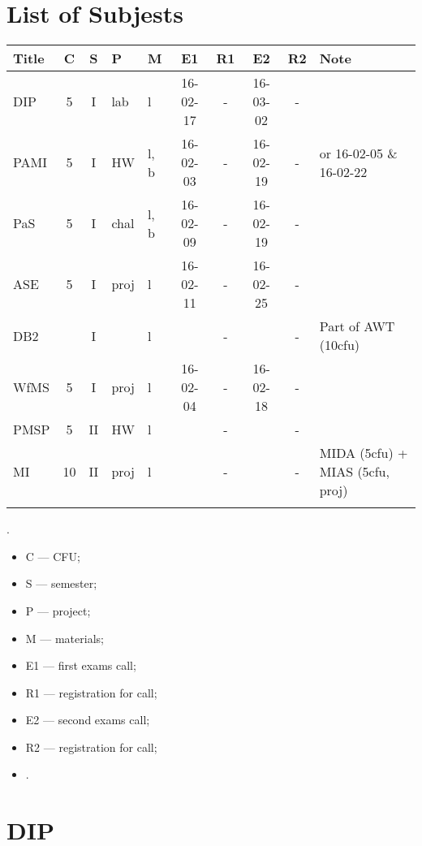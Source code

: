 \documentclass[a4paper,12pt]{article} %
\begin{document}
\tableofcontents

\newpage
\section{List of Subjests}
\begin{tabularx}{\textwidth}{|l|c|c|l|l|c|c|c|c|X|}
	\hline
	Title & C & S & P & M & E1 & R1 & E2 & R2 & Note \\
	\hline
	DIP & 5 & I & lab & l & 16-02-17 & - & 16-03-02 & - &  \\
	\hline
	PAMI & 5 & I & HW & l, b & 16-02-03 & - & 16-02-19 & - & or 16-02-05 \& 16-02-22\\
	\hline
	PaS & 5 & I & chal & l, b & 16-02-09 & - & 16-02-19 & - &  \\
	\hline
	ASE & 5 & I & proj & l & 16-02-11 & - & 16-02-25 & - &  \\
	\hline
	DB2 &  & I &  & l & & - & & - & Part of AWT (10cfu) \\
	\hline
	WfMS & 5 & I & proj & l & 16-02-04 & - & 16-02-18 & - &  \\
	\hline
	PMSP & 5 & II & HW & l & & - & & - &  \\
	\hline
	MI & 10 & II & proj & l & & - & & - & MIDA (5cfu) + MIAS (5cfu, proj) \\
	\hline
	&  &  &  &  &  & & & &  \\
	\hline
\end{tabularx}

.\\

\begin{itemize}
	\item C --- CFU;
	\item S --- semester;
	\item P --- project;
	\item M --- materials;
	\item E1 --- first exams call;
	\item R1 --- registration for call;
	\item E2 --- second exams call;
	\item R2 --- registration for call;
	\item .
\end{itemize}

\newpage
\section{DIP}
\end{document}
